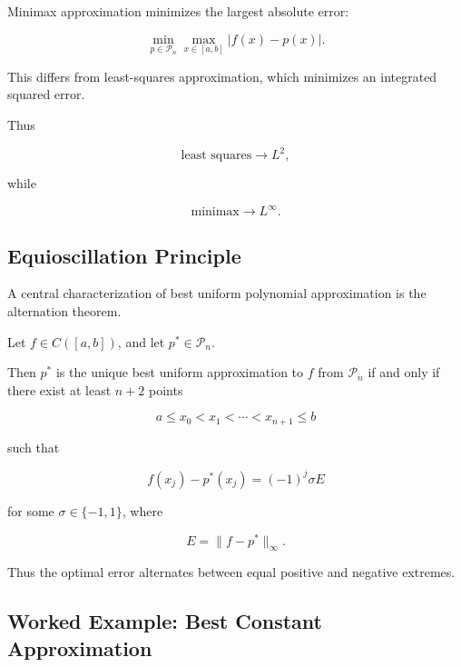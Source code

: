 Minimax approximation minimizes the largest absolute error:

\[
\boxed{
\min_{p\in\mathcal{P}_n}
\max_{x\in[a,b]}
|f(x)-p(x)|.
}
\]

This differs from least-squares approximation, which minimizes an
integrated squared error.

Thus

\[
\boxed{
\text{least squares}
\longrightarrow
L^2,
}
\]

while

\[
\boxed{
\text{minimax}
\longrightarrow
L^\infty.
}
\]

\subsection{Equioscillation Principle}
\label{subsec:equioscillation-principle}

A central characterization of best uniform polynomial approximation is
the alternation theorem.

\begin{theorem}
Let \(f\in C([a,b])\), and let \(p^\ast\in\mathcal{P}_n\).

Then \(p^\ast\) is the unique best uniform approximation to \(f\) from
\(\mathcal{P}_n\) if and only if there exist at least \(n+2\) points

\[
a\leq x_0<x_1<\cdots<x_{n+1}\leq b
\]

such that

\[
\boxed{
f(x_j)-p^\ast(x_j)
=
(-1)^j\sigma E
}
\]

for some \(\sigma\in\{-1,1\}\), where

\[
E=\|f-p^\ast\|_\infty.
\]
\end{theorem}

Thus the optimal error alternates between equal positive and negative
extremes.

\subsection{Worked Example: Best Constant Approximation}
\label{subsec:worked-best-constant}

